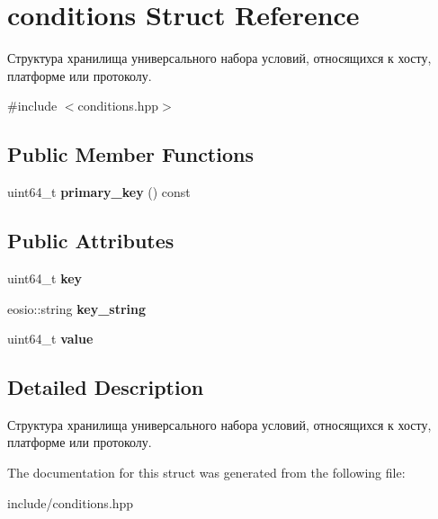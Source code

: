 \hypertarget{structconditions}{}\section{conditions Struct Reference}
\label{structconditions}


Структура хранилища универсального набора условий, относящихся к хосту, платформе или протоколу.  




{\ttfamily \#include $<$conditions.\+hpp$>$}

\subsection*{Public Member Functions}
\begin{DoxyCompactItemize}
\item 
\mbox{\label{structconditions_a234a5327f24d23fc88b500cd2309b57a}} 
uint64\+\_\+t {\bfseries primary\+\_\+key} () const
\end{DoxyCompactItemize}
\subsection*{Public Attributes}
\begin{DoxyCompactItemize}
\item 
\mbox{\label{structconditions_a50f42a1945a457079ae63b6e18bfca4a}} 
uint64\+\_\+t {\bfseries key}
\item 
\mbox{\label{structconditions_a1b699fa747d89b818d097018b6fb4d89}} 
eosio\+::string {\bfseries key\+\_\+string}
\item 
\mbox{\label{structconditions_af109613af52693bfd8c089c203e12a9f}} 
uint64\+\_\+t {\bfseries value}
\end{DoxyCompactItemize}


\subsection{Detailed Description}
Структура хранилища универсального набора условий, относящихся к хосту, платформе или протоколу. 

The documentation for this struct was generated from the following file\+:\begin{DoxyCompactItemize}
\item 
include/conditions.\+hpp\end{DoxyCompactItemize}
